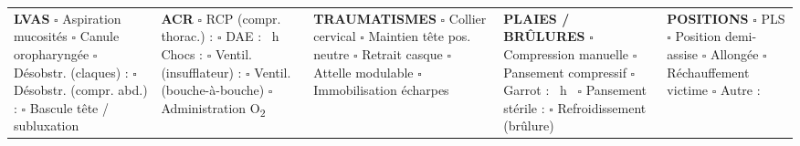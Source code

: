 \begin{tcolorbox}
\begin{tabular}{@{}p{\gestcol}|p{\gestcol}|p{\gestcol}|p{\gestcol}|p{\gestcol}@{}}
\textbf{\textcolor{pse-vert}{LVAS}} \newline
$\square$ Aspiration mucosités \newline
$\square$ Canule oropharyngée \newline
$\square$ Désobstr. (claques) : \hrulefill \newline
$\square$ Désobstr. (compr. abd.) : \hrulefill \newline
$\square$ Bascule tête / subluxation
&
\textbf{\textcolor{pse-rouge}{ACR}} \newline
$\square$ RCP (compr. thorac.) : \hrulefill \newline
$\square$ DAE : \enspace\hrulefill\, h \,\hrulefill\enspace Chocs : \hrulefill \newline
$\square$ Ventil. (insufflateur) : \hrulefill \newline
$\square$ Ventil. (bouche-à-bouche) \newline
$\square$ Administration O\textsubscript{2}
&
\textbf{\textcolor{pse-bleu}{TRAUMATISMES}} \newline
$\square$ Collier cervical \newline
$\square$ Maintien tête pos. neutre \newline
$\square$ Retrait casque \newline
$\square$ Attelle modulable \newline
$\square$ Immobilisation écharpes
&
\textbf{\textcolor{pse-orange}{PLAIES / BRÛLURES}} \newline
$\square$ Compression manuelle \newline
$\square$ Pansement compressif \newline
$\square$ Garrot : \enspace\hrulefill\, h \,\hrulefill \newline
$\square$ Pansement stérile : \hrulefill \newline
$\square$ Refroidissement (brûlure)
&
\textbf{\textcolor{pse-jaune}{POSITIONS}} \newline
$\square$ PLS \newline
$\square$ Position demi-assise \newline
$\square$ Allongée \newline
$\square$ Réchauffement victime \newline
$\square$ Autre : \hrulefill

\\
\end{tabular}
\end{tcolorbox}
